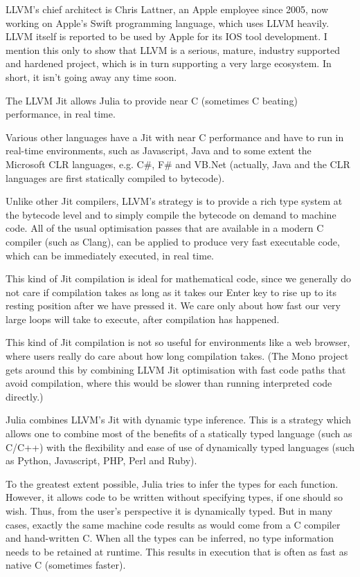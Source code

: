 \documentclass[a4paper,10pt]{article}
\begin{document}
LLVM's chief architect is Chris Lattner, an Apple employee since 2005, now working on Apple's 
Swift programming language, which uses LLVM heavily. LLVM itself is reported to be used by Apple
for its IOS tool development. I mention this only to show that LLVM is a serious, mature, 
industry supported and hardened project, which is in turn supporting a very large ecosystem. In 
short, it isn't going away any time soon.

The LLVM Jit allows Julia to provide near C (sometimes C beating) performance, in real time.

Various other languages have a Jit with near C performance and have to run in real-time
environments, such as Javascript, Java and to some extent the Microsoft CLR languages, e.g.
C\#, F\# and VB.Net (actually, Java and the CLR languages are first statically compiled to 
bytecode).

Unlike other Jit compilers, LLVM's strategy is to provide a rich type system at the bytecode
level and to simply compile the bytecode on demand to machine code. All of the usual optimisation
passes that are available in a modern C compiler (such as Clang), can be applied to produce very
fast executable code, which can be immediately executed, in real time.

This kind of Jit compilation is ideal for mathematical code, since we generally do not care if
compilation takes as long as it takes our Enter key to rise up to its resting position after we
have pressed it. We care only about how fast our very large loops will take to execute, after
compilation has happened.

This kind of Jit compilation is not so useful for environments like a web browser, where users
really do care about how long compilation takes. (The Mono project gets around this by combining
LLVM Jit optimisation with fast code paths that avoid compilation, where this would be slower
than running interpreted code directly.)

Julia combines LLVM's Jit with dynamic type inference. This is a strategy which allows one to
combine most of the benefits of a statically typed language (such as C/C++) with the flexibility
and ease of use of dynamically typed languages (such as Python, Javascript, PHP, Perl and 
Ruby).

To the greatest extent possible, Julia tries to infer the types for each function. However, it
allows code to be written without specifying types, if one should so wish. Thus, from the user's
perspective it is dynamically typed. But in many cases, exactly the same machine code results as
would come from a C compiler and hand-written C. When all the types can be inferred, no type 
information needs to be retained at runtime. This results in execution that is often as fast as 
native C (sometimes faster).
\end{document}
